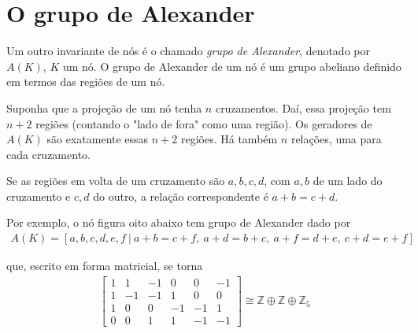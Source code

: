 \documentclass[a4paper,portuguese,11pt,twoside, leqno]{book}
\theoremstyle{definition}
\begin{document}
	\section{O grupo de Alexander}
	\hspace{12pt} Um outro invariante de nós é o chamado \textit{grupo de Alexander}, denotado por $A(K)$, $K$ um nó. O grupo de Alexander de um nó é um grupo abeliano definido em termos das regiões de um nó.
	\par\vspace{0.3cm} Suponha que a projeção de um nó tenha $n$ cruzamentos. Daí, essa projeção tem $n+2$ regiões (contando o "lado de fora" como uma região). Os geradores de $A(K)$ são exatamente essas $n+2$ regiões. Há também $n$ relações, uma para cada cruzamento.
	\par\vspace{0.3cm} Se as regiões em volta de um cruzamento são $a,b,c,d$, com $a,b$ de um lado do cruzamento e $c,d$ do outro, a relação correspondente é $a+b=c+d$.
	\par\vspace{0.3cm} Por exemplo, o nó figura oito abaixo tem grupo de Alexander dado por 
	\begin{align*}
	A(K) = [a,b,c,d,e,f \ \vert \ a+b=c+f,\ a+d=b+c,\ a+f=d+e,\ c+d=e+f] 
	\end{align*}
	\par\vspace{0.3cm} que, escrito em forma matricial, se torna
	\begin{align*}
	\begin{bmatrix}
	1 & 1 & -1 & 0 & 0 & -1 \\
	1 & -1 & -1 & 1 & 0 & 0 \\
	1 & 0 & 0 & -1 & -1 & 1 \\
	0 & 0 & 1 & 1 & -1 & -1 
	\end{bmatrix}\cong\mathbb{Z}\oplus\mathbb{Z}\oplus\mathbb{Z}_5
	\end{align*}
	
\end{document}
